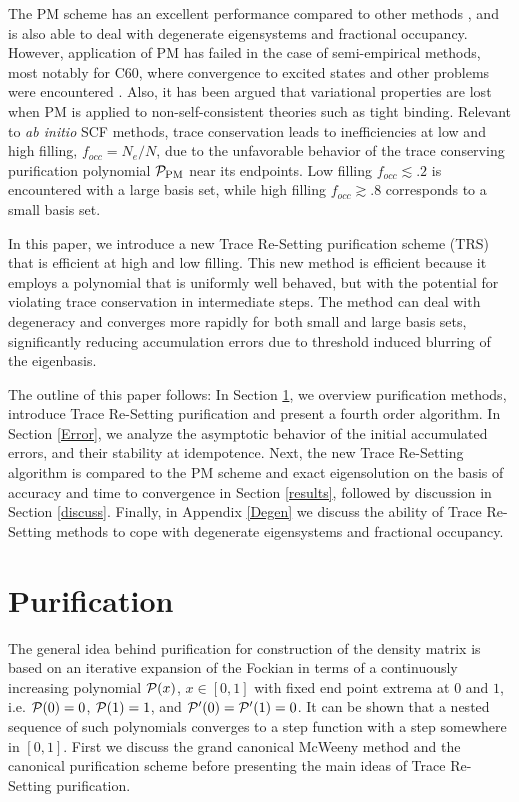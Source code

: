 \commentoutA{\documentclass[prl,aps,twocolumn,showpacs,twocolumngrid,superbib]{revtex4}}
\begin{document}
The PM scheme has an excellent performance compared to other methods \cite{ADaniels99,APalser99,GBerghold02,YShao02}, 
and is also able to deal with degenerate eigensystems and fractional occupancy.  However, application of PM has failed 
in the case of semi-empirical methods, most notably for C60, where convergence to excited states and 
other problems were encountered \cite{ADaniels99}.   Also, it has been argued that variational properties 
are lost when PM is applied to non-self-consistent theories such as tight binding\cite{APalser99}.
Relevant to {\it ab initio} SCF methods, trace conservation leads to  inefficiencies at low 
and high filling, $f_{occ}=N_e/N$, due to the unfavorable behavior of the trace conserving purification polynomial
${\cal P}_{\rm PM}$ near its endpoints.  Low filling $f_{occ}\lesssim .2$  is encountered with a large basis set, 
while high filling $f_{occ} \gtrsim .8$ corresponds to a small basis set.

In this paper, we introduce a new Trace Re-Setting purification scheme (TRS) 
that is efficient at high and low filling.  This new method is 
efficient because it employs a polynomial that is uniformly well behaved, but with the
potential for violating trace conservation in intermediate steps.  The method can deal with
degeneracy and converges more rapidly for both small and large basis sets, significantly reducing 
accumulation errors due to threshold induced blurring of the eigenbasis.

The outline of this paper follows:  In Section \ref{TSP}, we overview purification methods, introduce 
Trace Re-Setting purification
and present a fourth order algorithm.  In Section \ref{Error}, we analyze the asymptotic behavior of 
the initial accumulated errors, and their stability at idempotence.  Next, the new Trace Re-Setting 
algorithm is compared to the PM scheme and exact eigensolution on the basis of accuracy and time to 
convergence in Section \ref{results}, followed by discussion in Section \ref{discuss}.  Finally,
in Appendix \ref{Degen} we discuss the ability of Trace Re-Setting methods to cope with degenerate 
eigensystems and fractional occupancy.  

\section{Purification}\label{TSP}

The general idea behind purification for construction 
of the density matrix is based on an iterative expansion of the
Fockian in terms of a continuously increasing 
polynomial ${\cal P}(x)$, $x \in [0,1]$  with fixed end point extrema
at $0$ and $1$, i.e. ${\cal P}(0) = 0$, ${\cal P}(1) = 1$, and ${\cal P}'(0)={\cal P}'(1)=0$. 
It can be shown that a nested sequence of such polynomials 
converges to a step function with a step somewhere in $[0,1]$. 
First we discuss the grand canonical McWeeny method and the canonical
purification scheme before presenting the main ideas of Trace Re-Setting purification.
\end{document}
